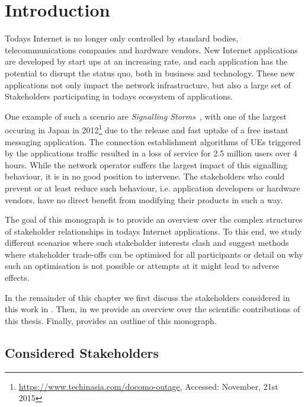 \chapter{Introduction}\label{chap:introduction}

Todays Internet is no longer only controlled by standard bodies, telecommunications companies and hardware vendors. 
New Internet applications are developed by start ups at an increasing rate, and each application has the potential to disrupt the status quo, both in business and technology.
These new applications not only impact the network infrastructure, but also a large set of Stakeholders participating in todays ecosystem of applications.

One example of such a scenrio are \emph{Signalling Storms}~\cite{Huawei2011}, with one of the largest occuring in Japan in 2012\footnote{\url{https://www.techinasia.com/docomo-outage}, Accessed: November, 21st 2015} due to the release and fast uptake of a free instant messaging application.
The connection establishment algorithms of \glspl{UE} triggered by the applications traffic resulted in a loss of service for 2.5 million users over 4 hours.
While the network operator suffers the largest impact of this signalling behaviour, it is in no good position to intervene.
The stakeholders who could prevent or at least reduce such behaviour, i.e. application developers or hardware vendors, have no direct benefit from modifying their products in such a way.  

The goal of this monograph is to provide an overview over the complex structures of stakeholder relationships in todays Internet applications.
To this end, we study different scenarios where such stakeholder interests clash and suggest methods where stakeholder trade-offs can be optimised for all participants or detail on why such an optimisation is not possible or attempts at it might lead to adverse effects.

In the remainder of this chapter we first discuss the stakeholders considered in this work in .
Then, in  we provide an overview over the scientific contributions of this thesis.
Finally,  provides an outline of this monograph.

\section{Considered Stakeholders}\label{sec:introduction:considered_stakeholders}

